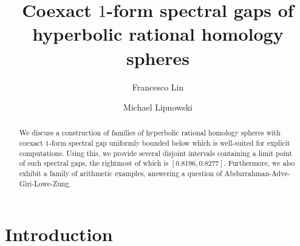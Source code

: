 \documentclass[11pt]{amsart}
\theoremstyle{definition}
\theoremstyle{remark}
\begin{document}
\title{Coexact $1$-form spectral gaps of hyperbolic rational homology spheres}

\author{Francesco Lin}
\address{Department of Mathematics, Columbia University} 

\author{Michael Lipnowski}
\address{Department of Mathematics, Ohio State University} 

\begin{abstract} We discuss a construction of families of hyperbolic rational homology spheres with coexact $1$-form spectral gap uniformly bounded below which is well-suited for explicit computations. Using this, we provide several disjoint intervals containing a limit point of such  spectral gaps, the rightmost of which is $[0.8196,0.8277]$. Furthermore, we also exhibit a family of arithmetic examples, answering a question of Abdurrahman-Adve-Giri-Lowe-Zung.
\end{abstract}

\maketitle

\section*{Introduction}
\end{document}
